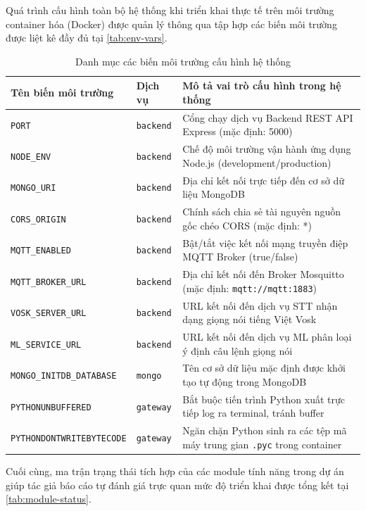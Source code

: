 Quá trình cấu hình toàn bộ hệ thống khi triển khai thực tế trên môi trường container hóa (Docker) được quản lý thông qua tập hợp các biến môi trường được liệt kê đầy đủ tại \autoref{tab:env-vars}.

\begin{table}[H]
\centering
\caption{Danh mục các biến môi trường cấu hình hệ thống}
\label{tab:env-vars}
\begin{tabular}{p{4.5cm} p{2.0cm} p{8.5cm}}
\toprule
\textbf{Tên biến môi trường} & \textbf{Dịch vụ} & \textbf{Mô tả vai trò cấu hình trong hệ thống} \\
\midrule
\texttt{PORT} & \texttt{backend} & Cổng chạy dịch vụ Backend REST API Express (mặc định: 5000) \\
\texttt{NODE\_ENV} & \texttt{backend} & Chế độ môi trường vận hành ứng dụng Node.js (development/production) \\
\texttt{MONGO\_URI} & \texttt{backend} & Địa chỉ kết nối trực tiếp đến cơ sở dữ liệu MongoDB \\
\texttt{CORS\_ORIGIN} & \texttt{backend} & Chính sách chia sẻ tài nguyên nguồn gốc chéo CORS (mặc định: *) \\
\texttt{MQTT\_ENABLED} & \texttt{backend} & Bật/tắt việc kết nối mạng truyền điệp MQTT Broker (true/false) \\
\texttt{MQTT\_BROKER\_URL} & \texttt{backend} & Địa chỉ kết nối đến Broker Mosquitto (mặc định: \texttt{mqtt://mqtt:1883}) \\
\texttt{VOSK\_SERVER\_URL} & \texttt{backend} & URL kết nối đến dịch vụ STT nhận dạng giọng nói tiếng Việt Vosk \\
\texttt{ML\_SERVICE\_URL} & \texttt{backend} & URL kết nối đến dịch vụ ML phân loại ý định câu lệnh giọng nói \\
\texttt{MONGO\_INITDB\_DATABASE} & \texttt{mongo} & Tên cơ sở dữ liệu mặc định được khởi tạo tự động trong MongoDB \\
\texttt{PYTHONUNBUFFERED} & \texttt{gateway} & Bắt buộc tiến trình Python xuất trực tiếp log ra terminal, tránh buffer \\
\texttt{PYTHONDONTWRITEBYTECODE} & \texttt{gateway} & Ngăn chặn Python sinh ra các tệp mã máy trung gian \texttt{.pyc} trong container \\
\bottomrule
\end{tabular}
\end{table}

Cuối cùng, ma trận trạng thái tích hợp của các module tính năng trong dự án giúp tác giả báo cáo tự đánh giá trực quan mức độ triển khai được tổng kết tại \autoref{tab:module-status}.

